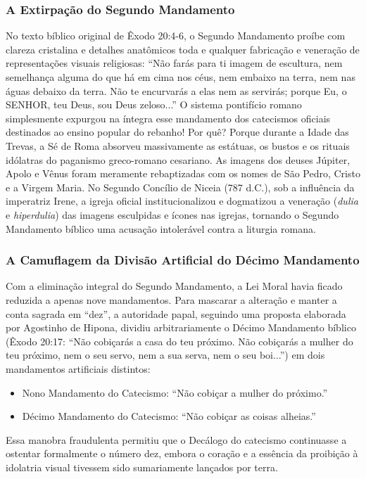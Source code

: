 \documentclass[11pt,a4paper,openany]{book}
\begin{document}
\subsubsection*{A Extirpação do Segundo Mandamento}
No texto bíblico original de Êxodo 20:4-6, o Segundo Mandamento proíbe com clareza cristalina e detalhes anatômicos toda e qualquer fabricação e veneração de representações visuais religiosas: ``Não farás para ti imagem de escultura, nem semelhança alguma do que há em cima nos céus, nem embaixo na terra, nem nas águas debaixo da terra. Não te encurvarás a elas nem as servirás; porque Eu, o SENHOR, teu Deus, sou Deus zeloso...''
O sistema pontifício romano simplesmente expurgou na íntegra esse mandamento dos catecismos oficiais destinados ao ensino popular do rebanho! Por quê? Porque durante a Idade das Trevas, a Sé de Roma absorveu massivamente as estátuas, os bustos e os rituais idólatras do paganismo greco-romano cesariano. As imagens dos deuses Júpiter, Apolo e Vênus foram meramente rebaptizadas com os nomes de São Pedro, Cristo e a Virgem Maria. No Segundo Concílio de Niceia (787 d.C.), sob a influência da imperatriz Irene, a igreja oficial institucionalizou e dogmatizou a veneração (\textit{dulia} e \textit{hiperdulia}) das imagens esculpidas e ícones nas igrejas, tornando o Segundo Mandamento bíblico uma acusação intolerável contra a liturgia romana.


\subsubsection*{A Camuflagem da Divisão Artificial do Décimo Mandamento}
Com a eliminação integral do Segundo Mandamento, a Lei Moral havia ficado reduzida a apenas nove mandamentos. Para mascarar a alteração e manter a conta sagrada em ``dez'', a autoridade papal, seguindo uma proposta elaborada por Agostinho de Hipona, dividiu arbitrariamente o Décimo Mandamento bíblico (Êxodo 20:17: ``Não cobiçarás a casa do teu próximo. Não cobiçarás a mulher do teu próximo, nem o seu servo, nem a sua serva, nem o seu boi...'') em dois mandamentos artificiais distintos:
\begin{itemize}
  \item Nono Mandamento do Catecismo: ``Não cobiçar a mulher do próximo.''
  \item Décimo Mandamento do Catecismo: ``Não cobiçar as coisas alheias.''
\end{itemize}

Essa manobra fraudulenta permitiu que o Decálogo do catecismo continuasse a ostentar formalmente o número dez, embora o coração e a essência da proibição à idolatria visual tivessem sido sumariamente lançados por terra.
\end{document}
